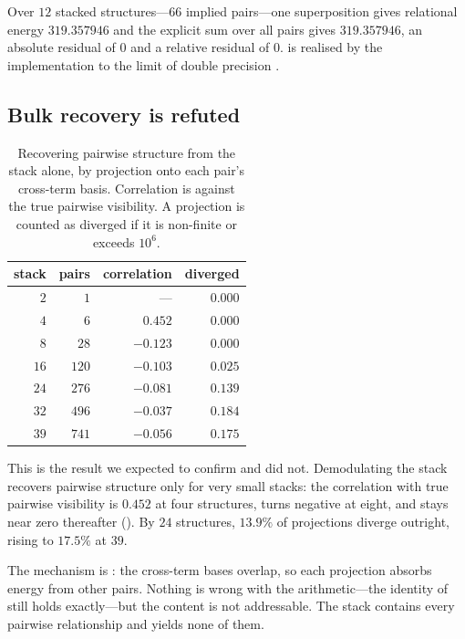\documentclass[11pt,twocolumn,a4paper]{article}
\theoremstyle{upthm}
\theoremstyle{definition}
\theoremstyle{remark}
\begin{document}
Over $12$ stacked structures---$66$ implied pairs---one superposition
gives relational energy $319.357946$ and the explicit sum over all pairs
gives $319.357946$, an absolute residual of $0$ and a relative residual
of $0$.  is realised by the implementation to the limit
of double precision \citep{ieee754,highamNA2002}.

\subsection{Bulk recovery is refuted}
\label{sec:capacity}

\begin{table}[htbp]
\centering\small
\caption{Recovering pairwise structure from the stack alone, by
projection onto each pair's cross-term basis. Correlation is against the
true pairwise visibility. A projection is counted as diverged if it is
non-finite or exceeds $10^6$.}
\label{tab:capacity}
\begin{tabular}{@{}rrrr@{}}
\toprule
stack & pairs & correlation & diverged\\
\midrule
$2$  & $1$   & ---      & $0.000$\\
$4$  & $6$   & $0.452$  & $0.000$\\
$8$  & $28$  & $-0.123$ & $0.000$\\
$16$ & $120$ & $-0.103$ & $0.025$\\
$24$ & $276$ & $-0.081$ & $0.139$\\
$32$ & $496$ & $-0.037$ & $0.184$\\
$39$ & $741$ & $-0.056$ & $0.175$\\
\bottomrule
\end{tabular}
\end{table}

This is the result we expected to confirm and did not. Demodulating the
stack recovers pairwise structure only for very small stacks: the
correlation with true pairwise visibility is $0.452$ at four structures,
turns negative at eight, and stays near zero thereafter
(). By $24$ structures, $13.9\%$ of projections
diverge outright, rising to $17.5\%$ at $39$.

The mechanism is : the cross-term bases overlap, so
each projection absorbs energy from other pairs. Nothing is wrong with
the arithmetic---the identity of  still holds
exactly---but the content is not addressable. The stack contains every
pairwise relationship and yields none of them.
\end{document}

